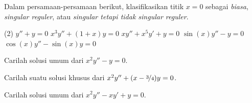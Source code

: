 \setcounter{exercise}{100}

\begin{exercise}
Dalam persamaan-persamaan berikut,
klasifikasikan titik $x=0$ sebagai \emph{biasa}, \emph{singular reguler}, atau
\emph{singular tetapi tidak singular reguler}.
\begin{tasks}(2)
\task $y''+y=0$
\task $x^3y''+(1+x)y=0$
\task $xy''+x^5y'+y=0$
\task $\sin(x)y''-y=0$
\task $\cos(x)y''-\sin(x)y=0$
\end{tasks}
\end{exercise}

\begin{exercise}
Carilah solusi umum dari $x^2 y'' -y = 0$.
\end{exercise}

\begin{exercise}
Carilah suatu solusi khusus dari $x^2 y'' +(x-\nicefrac{3}{4})y = 0$.
\end{exercise}

\begin{exercise}[rumit]
Carilah solusi umum dari $x^2 y'' - x y' +y = 0$.
\end{exercise}

